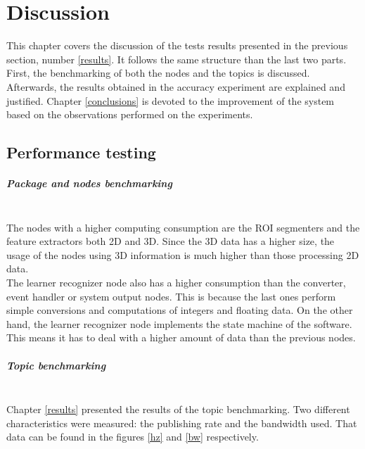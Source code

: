 \chapter{Discussion}
\label{discussion}

This chapter covers the discussion of the tests results presented in the previous section, number \ref{results}.
It follows the same structure than the last two parts. 
First, the benchmarking of both the nodes and the topics is discussed. 
Afterwards, the results obtained in the accuracy experiment are explained and justified. 
Chapter \ref{conclusions} is devoted to the improvement of the system based on the observations performed on the experiments. 

\section{Performance testing}
	\paragraph{Package and nodes benchmarking}\mbox{}
		\\

			The nodes with a higher computing consumption are the ROI segmenters and the feature extractors both 2D and 3D. 
			Since the 3D data has a higher size, the usage of the nodes using 3D information is much higher than those processing 2D data. 
			\\
			The learner recognizer node also has a higher consumption than the converter, event handler or system output nodes. 
			This is because the last ones perform simple conversions and computations of integers and floating data. 
			On the other hand, the learner recognizer node implements the state machine of the software. 
			This means it has to deal with a higher amount of data than the previous nodes. 




		\paragraph{Topic benchmarking}\mbox{}\\

			Chapter \ref{results} presented the results of the topic benchmarking. 
			Two different characteristics were measured: the publishing rate and the bandwidth used. 
			That data can be found in the figures \ref{hz} and \ref{bw} respectively. 
			\\

